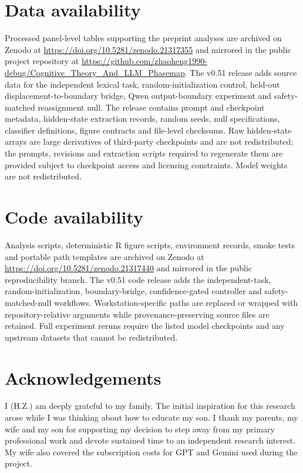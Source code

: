 \documentclass[11pt]{article}
\begin{document}
{\setlength{\parindent}{0pt}
\section{Data availability}
Processed panel-level tables supporting the preprint analyses are archived on Zenodo at \url{https://doi.org/10.5281/zenodo.21317355} and mirrored in the public project repository at \url{https://github.com/zhaoheng1990-debug/Cognitive_Theory_And_LLM_Phasemap}. The v0.51 release adds source data for the independent lexical task, random-initialization control, held-out displacement-to-boundary bridge, Qwen output-boundary experiment and safety-matched reassignment null. The release contains prompt and checkpoint metadata, hidden-state extraction records, random seeds, null specifications, classifier definitions, figure contracts and file-level checksums. Raw hidden-state arrays are large derivatives of third-party checkpoints and are not redistributed; the prompts, revisions and extraction scripts required to regenerate them are provided subject to checkpoint access and licensing constraints. Model weights are not redistributed.

\section{Code availability}
Analysis scripts, deterministic R figure scripts, environment records, smoke tests and portable path templates are archived on Zenodo at \url{https://doi.org/10.5281/zenodo.21317440} and mirrored in the public reproducibility branch. The v0.51 code release adds the independent-task, random-initialization, boundary-bridge, confidence-gated controller and safety-matched-null workflows. Workstation-specific paths are replaced or wrapped with repository-relative arguments while provenance-preserving source files are retained. Full experiment reruns require the listed model checkpoints and any upstream datasets that cannot be redistributed.

\section{Acknowledgements}
I (H.Z.) am deeply grateful to my family. The initial inspiration for this research arose while I was thinking about how to educate my son. I thank my parents, my wife and my son for supporting my decision to step away from my primary professional work and devote sustained time to an independent research interest. My wife also covered the subscription costs for GPT and Gemini used during the project.

}
\end{document}
